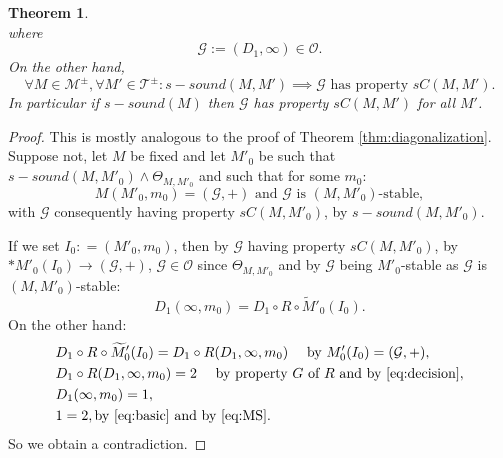 \documentclass{amsart}  %
\numberwithin{equation}{section}
\newtheorem{theorem}[equation]{Theorem}
\theoremstyle{definition}
\theoremstyle{remark}
\begin{document}
{\begin{theorem}
\begin{equation*}
\end{equation*}
where $$\mathcal{G}:=(D_1, \infty) \in \mathcal{O}.$$
On the other hand, 
\begin{equation} 
\forall M \in \mathcal{M} ^{\pm}, \forall M' \in \mathcal{T} ^{\pm}: s-sound ({M}, {M}')  \implies \text{$\mathcal{G}$ has property $sC ({M},{M}')$}.
\end{equation}
 In particular if $s-sound ({M})$ then $\mathcal{G}$ has property $sC ({M},{M}')$ for all $M'$.
\end{theorem}
\begin{proof}  This is mostly analogous to the proof of Theorem \ref{thm:diagonalization}. Suppose not, let $M$ be fixed and let ${M}' _{0} $ be such that $s-sound ({M},{M}' _{0} ) \land \Theta _{{M}, {M}' _{0} }$ and such that for some $m _{0} $:
\begin{equation*} 
   M ({M}' _{0} ,m _{0} ) = (\mathcal{G}, +)  \text{ and $\mathcal{G}$ is $(M,M' _{0} )$-stable},
\end{equation*}
with $\mathcal{G}$ consequently having property $sC (M,M' _{0} )$, by $s-sound (M,M' _{0} )$.

If we set $I _{0}: = ({M}' _{0} , m _{0})$, then 
   by  $\mathcal{G}$ having property $sC (M,M' _{0} )$, by $*M' _{0}   (I _{0} ) \to (\mathcal{G},+)$, $\mathcal{G} \in \mathcal{O}$ since $\Theta _{M,M' _{0} } $ and by  $\mathcal{G}$ being $M' _{0} $-stable as $\mathcal{G}$ is $(M,M' _{0} )$-stable:
\begin {equation} \label{eq:basic}
   D_1 (\infty, m _{0}) = D_1 \circ R \circ  \widetilde{M}' _{0} (I _{0} ).
\end{equation}
On the other hand:
\begin{align} \label{eq:MS}
      &  D_1 \circ R \circ  \widetilde{M}' _{0}   (I _{0} ) = D_1 \circ R (D_1, \infty, m _{0} )   \quad \text{ by $M' _{0}  (I _{0} ) = (\mathcal{G},+)$}, \\
 &  D_1 \circ R (D_1, \infty, m _{0} )=2 \quad \text{ by property $G$ of $R$ and by \eqref{eq:decision}}, \label{eq:MS} \\
& D_1 (\infty, m _{0} ) =1, \\ 
& 1=2, \text{by \eqref{eq:basic} and by \eqref{eq:MS}.
   }
\end{align}
 So we obtain a contradiction.
%
%
%


\end{proof}}
\end{document}
